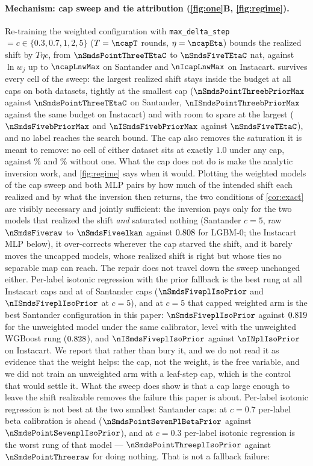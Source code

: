 \documentclass[sigconf,nonacm]{acmart}
\newcommand{\Nm}{\textsf{LGBM-0}\xspace}
\begin{document}
\paragraph{Mechanism: cap sweep and tie attribution (\cref{fig:one}B, \cref{fig:regime}).} Re-training the weighted configuration with \texttt{max\_delta\_step}$=c\in\{0.3,0.7,1,2,5\}$ ($T=\ncapT$ rounds, $\eta=\ncapEta$) bounds the realized shift by $T\eta c$, from $\nSmdsPointThreeTEtaC$ to $\nSmdsFiveTEtaC$ nat, against $\ln w_j$ up to $\ncapLnwMax$ on Santander and $\nIcapLnwMax$ on Instacart.  survives every cell of the sweep: the largest realized shift stays inside the budget at all \ncapN{} caps on both datasets, tightly at the smallest cap ($\nSmdsPointThreebPriorMax$ against $\nSmdsPointThreeTEtaC$ on Santander, $\nISmdsPointThreebPriorMax$ against the same budget on Instacart) and with room to spare at the largest ($\nSmdsFivebPriorMax$ and $\nISmdsFivebPriorMax$ against $\nSmdsFiveTEtaC$), and no label reaches the search bound. The cap also removes the saturation it is meant to remove: no cell of either dataset sits at exactly $1.0$ under any cap, against \ncapNoneSatOne\% and \nIcapNoneSatOne\% without one. What the cap does not do is make the analytic inversion work, and \cref{fig:regime} says when it would. Plotting the weighted models of the cap sweep and both MLP pairs by how much of the intended shift each realized and by what the inversion then returns, the two conditions of \cref{cor:exact} are visibly necessary and jointly sufficient: the inversion pays only for the two models that realized the shift \emph{and} saturated nothing (Santander $c=5$, raw $\nSmdsFiveraw$ to $\nSmdsFiveelkan$ against $0.808$ for \Nm; the Instacart MLP below), it over-corrects wherever the cap starved the shift, and it barely moves the uncapped models, whose realized shift is right but whose ties no separable map can reach. The repair does not travel down the sweep unchanged either. Per-label isotonic regression with the prior fallback is the best rung at all \nInCapsIsoBest{} Instacart caps and at \nnCapsIsoBest{} of \nnCapsRungs{} Santander caps ($\nSmdsFiveplIsoPrior$ and $\nISmdsFiveplIsoPrior$ at $c=5$), and at $c=5$ that capped weighted arm is the best Santander configuration in this paper: $\nSmdsFiveplIsoPrior$ against $0.819$ for the unweighted model under the same calibrator, level with the unweighted WGBoost rung ($0.828$), and $\nISmdsFiveplIsoPrior$ against $\nINplIsoPrior$ on Instacart. We report that rather than bury it, and we do not read it as evidence that the weight helps: the cap, not the weight, is the free variable, and we did not train an unweighted arm with a leaf-step cap, which is the control that would settle it. What the sweep does show is that a cap large enough to leave the shift realizable removes the failure this paper is about. Per-label isotonic regression is not best at the two smallest Santander caps: at $c=0.7$ per-label beta calibration is ahead ($\nSmdsPointSevenPlBetaPrior$ against $\nSmdsPointSevenplIsoPrior$), and at $c=0.3$ per-label isotonic regression is the worst rung of that model --- $\nSmdsPointThreeplIsoPrior$ against $\nSmdsPointThreeraw$ for doing nothing. That is not a fallback failure: 
\end{document}
